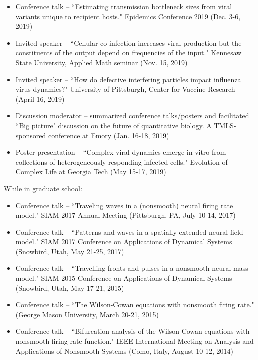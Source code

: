 \documentclass[a4paper,10pt]{article}
\begin{document}
{\begin{itemize}[leftmargin=*]
            	\item Conference talk -- ``Estimating transmission bottleneck sizes from viral variants unique to recipient hosts." Epidemics Conference 2019 (Dec. 3-6, 2019)
                \item Invited speaker -- ``Cellular co-infection increases viral production but the constituents of the output depend on frequencies of the input." Kennesaw State University, Applied 	Math seminar (Nov. 15, 2019)
               	\item Invited speaker -- ``How do defective interfering particles impact influenza virus dynamics?" University of Pittsburgh, Center for Vaccine Research (April 16, 2019)
                \item Discussion moderator -- summarized conference talks/posters and facilitated ``Big picture" discussion on the future of quantitative biology. A TMLS-sponsored conference at Emory (Jan. 16-18, 2019) 
                \item Poster presentation -- ``Complex viral dynamics emerge in vitro from collections of heterogeneously-responding infected cells." Evolution of Complex Life at Georgia Tech (May 15-17, 2019)
            \end{itemize}
            While in graduate school:
            \begin{itemize}[leftmargin=*] 
            	\item Conference talk -- ``Traveling waves in a (nonsmooth) neural firing rate model." SIAM 2017 Annual Meeting (Pittsburgh, PA, July 10-14, 2017)
        	\item Conference talk -- ``Patterns and waves in a spatially-extended neural field model." SIAM 2017 Conference on Applications of Dynamical Systems \\(Snowbird, Utah, May 21-25, 2017)
            	\item Conference talk -- ``Travelling fronts and pulses in a nonsmooth neural mass model." SIAM 2015 Conference on Applications of Dynamical Systems \\(Snowbird, Utah, May 17-21, 2015)
        	\item Conference talk -- ``The Wilson-Cowan equations with nonsmooth firing rate." (George Mason University, March 20-21, 2015)
        	\item Conference talk --  ``Bifurcation analysis of the Wilson-Cowan equations with nonsmooth firing rate function." IEEE International Meeting on Analysis and Applications of Nonsmooth Systems (Como, Italy, August 10-12, 2014)
            \end{itemize}
        }
        
\end{document}
